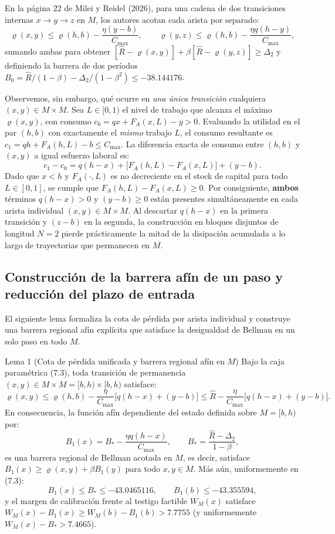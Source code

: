 \documentclass[11pt,letterpaper]{article}
\theoremstyle{plain}
\newtheorem*{namedthm}{\protect\namedthmname}
\newcommand{\namedthmname}{}
\newenvironment{thm_box}[1]{\renewcommand{\namedthmname}{#1}\begin{namedthm}}{\end{namedthm}}
\begin{document}
En la página 22 de Milei y Reidel (2026), para una cadena de dos transiciones internas $x\to y\to z$ en $M$, los autores acotan cada arista por separado:
\[
\varrho(x,y) \le \varrho(h,b) - \frac{\eta(y-b)}{C_{\max}}, \qquad \varrho(y,z) \le \varrho(h,b) - \frac{\eta q(h-y)}{C_{\max}},
\]
sumando ambas para obtener $[\widehat{R}-\varrho(x,y)]+\beta[\widehat{R}-\varrho(y,z)]\ge\Delta_2$ y definiendo la barrera de dos períodos $B_0 = \widehat{R}/(1-\beta) - \Delta_2/(1-\beta^2) \le -38.144176$.

Observemos, sin embargo, qué ocurre en \emph{una única transición} cualquiera $(x,y)\in M\times M$. Sea $L\in[0,1)$ el nivel de trabajo que alcanza el máximo $\varrho(x,y)$, con consumo $c_0=qx+F_A(x,L)-y>0$. Evaluando la utilidad en el par $(h,b)$ con exactamente el \emph{mismo} trabajo $L$, el consumo resultante es $c_1=qh+F_A(h,L)-b \le C_{\max}$. La diferencia exacta de consumo entre $(h,b)$ y $(x,y)$ a igual esfuerzo laboral es:
\[
c_1 - c_0 = q(h-x) + \big[F_A(h,L) - F_A(x,L)\big] + (y-b).
\]
Dado que $x<h$ y $F_A(\cdot,L)$ es no decreciente en el stock de capital para todo $L\in[0,1]$, se cumple que $F_A(h,L)-F_A(x,L)\ge 0$. Por consiguiente, \textbf{ambos} términos $q(h-x)>0$ y $(y-b)\ge 0$ están presentes simultáneamente en cada arista individual $(x,y)\in M\times M$. Al descartar $q(h-x)$ en la primera transición y $(z-b)$ en la segunda, la construcción en bloques disjuntos de longitud $N=2$ pierde prácticamente la mitad de la disipación acumulada a lo largo de trayectorias que permanecen en $M$.

\subsection{Construcción de la barrera afín de un paso y reducción del plazo de entrada}

El siguiente lema formaliza la cota de pérdida por arista individual y construye una barrera regional afín explícita que satisface la desigualdad de Bellman en un solo paso en todo $M$.

\begin{thm_box}{Lema 1 (Cota de pérdida unificada y barrera regional afín en $M$)}
Bajo la caja paramétrica (7.3), toda transición de permanencia $(x,y)\in M\times M=[b,h)\times[b,h)$ satisface:
\[
\varrho(x,y) \le \varrho(h,b) - \frac{\eta}{C_{\max}}\big[q(h-x)+(y-b)\big] \le \widehat{R} - \frac{\eta}{C_{\max}}\big[q(h-x)+(y-b)\big].
\]
En consecuencia, la función afín dependiente del estado definida sobre $M=[b,h)$ por:
\[
B_1(x) = B_* - \frac{\eta q(h-x)}{C_{\max}}, \qquad B_* = \frac{\widehat{R}-\Delta_2}{1-\beta},
\]
es una barrera regional de Bellman acotada en $M$, es decir, satisface $B_1(x) \ge \varrho(x,y) + \beta B_1(y)$ para todo $x,y\in M$. Más aún, uniformemente en (7.3):
\[
B_1(x) \le B_* \le -43.0465116, \qquad B_1(b) \le -43.355594,
\]
y el margen de calibración frente al testigo factible $W_M(x)$ satisface $W_M(x)-B_1(x) \ge W_M(b)-B_1(b) > 7.7755$ (y uniformemente $W_M(x)-B_* > 7.4665$).
\end{thm_box}
\end{document}
